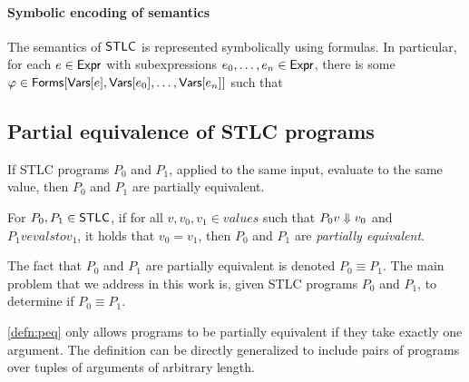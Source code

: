 \paragraph{Symbolic encoding of semantics}
%
The semantics of $\mathsf{STLC}$ is represented symbolically using \lia
formulas.
%
%
In particular, for each $e \in \mathsf{Expr}$ with subexpressions $e_0,
\ldots, e_n \in \mathsf{Expr}$, there is some $\varphi \in \mathsf{Forms}[ \mathsf{Vars}[e],
  \mathsf{Vars}[e_0], \ldots, \mathsf{Vars}[e_n] ]$ such that


\subsection{Partial equivalence of STLC programs}
\label{sec:peq}
%
If STLC programs $P_0$ and $P_1$, applied to the same input, evaluate
to the same value, then $P_0$ and $P_1$ are partially equivalent.
%
\begin{defn}
  \label{defn:peq}
  For $P_0, P_1 \in \mathsf{STLC}$, if for all $v, v_0, v_1 \in values$ such
  that $P_0 v \Downarrow v_0$ and $P_1 v evalsto v_1$, it holds that
  $v_0 = v_1$, then $P_0$ and $P_1$ are \emph{partially equivalent}.
\end{defn}
%
The fact that $P_0$ and $P_1$ are partially equivalent is denoted $P_0
\equiv P_1$.
%
The main problem that we address in this work is, given STLC programs
$P_0$ and $P_1$, to determine if $P_0 \equiv P_1$.

\autoref{defn:peq} only allows programs to be partially equivalent if
they take exactly one argument.
%
The definition can be directly generalized to include pairs of
programs over tuples of arguments of arbitrary length.

